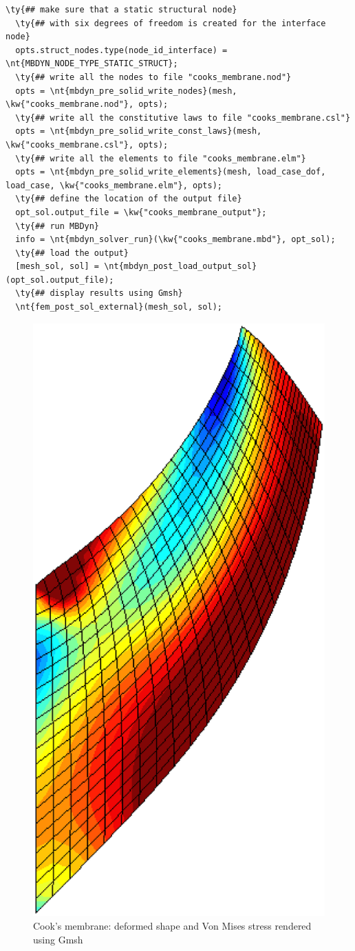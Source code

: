 \begin{Verbatim}[commandchars=\\\{\}]
  \ty{## make sure that a static structural node}
  \ty{## with six degrees of freedom is created for the interface node}
  opts.struct_nodes.type(node_id_interface) = \nt{MBDYN_NODE_TYPE_STATIC_STRUCT};
  \ty{## write all the nodes to file "cooks_membrane.nod"}
  opts = \nt{mbdyn_pre_solid_write_nodes}(mesh, \kw{"cooks_membrane.nod"}, opts);
  \ty{## write all the constitutive laws to file "cooks_membrane.csl"}
  opts = \nt{mbdyn_pre_solid_write_const_laws}(mesh, \kw{"cooks_membrane.csl"}, opts);
  \ty{## write all the elements to file "cooks_membrane.elm"}
  opts = \nt{mbdyn_pre_solid_write_elements}(mesh, load_case_dof, load_case, \kw{"cooks_membrane.elm"}, opts);
  \ty{## define the location of the output file}
  opt_sol.output_file = \kw{"cooks_membrane_output"};
  \ty{## run MBDyn}
  info = \nt{mbdyn_solver_run}(\kw{"cooks_membrane.mbd"}, opt_sol);
  \ty{## load the output}
  [mesh_sol, sol] = \nt{mbdyn_post_load_output_sol}(opt_sol.output_file);
  \ty{## display results using Gmsh}
  \nt{fem_post_sol_external}(mesh_sol, sol);
\end{Verbatim}

\begin{figure}[htb]
\centering
\includegraphics[width=.25\textwidth]{elemsolid}
\caption{Cook's membrane: deformed shape and Von Mises stress rendered using Gmsh}
\label{fig:EL:SOLID:COOKS-MEMBRANE}
\end{figure}
\clearpage

